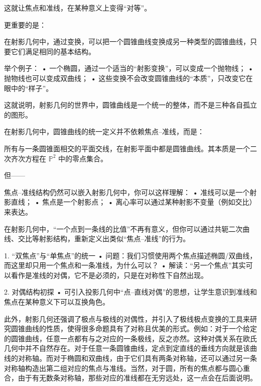 这就让焦点和准线，在某种意义上变得“对等”。

更重要的是：

在射影几何中，通过变换，可以把一个圆锥曲线变换成另一种类型的圆锥曲线，只要它们满足相同的基本结构。

举个例子：
	•	一个椭圆，通过一个适当的“射影变换”，可以变成一个抛物线；
	•	抛物线也可以变成双曲线；
	•	这些变换不会改变圆锥曲线的“本质”，只改变它在眼中的“样子”。

这就说明，射影几何的世界中，圆锥曲线是一个统一的整体，而不是三种各自孤立的图形。


在射影几何中，圆锥曲线的统一定义并不依赖焦点–准线，而是：

所有与一条圆锥面相交的平面交线，在射影平面中都是圆锥曲线。其本质是一个二次齐次方程在 $\mathbb{P}^2$ 中的零点集合。

但——

焦点–准线结构仍然可以嵌入射影几何中，你可以这样理解：
	•	准线可以是一个射影直线；
	•	焦点是一个射影点；
	•	离心率可以通过某种射影不变量（例如交比）来表达。

在射影几何中，“一个点到一条线的比值”不再有意义，但你可以通过共轭二次曲线、交比等射影结构，重新定义出类似“焦点–准线”的行为。

1. “双焦点”与“单焦点”的统一
	•	问题：我们习惯使用两个焦点描述椭圆/双曲线，而这里却只用一个焦点和一条准线，为什么可以？
	•	解读：“另一个焦点”其实可以看作是准线的对偶，它不是必须的，只是在对称性下自然出现。

2. 对偶结构初探
	•	可引入投影几何中“点–直线对偶”的思想，让学生意识到准线和焦点在某种意义下可以互换角色。

此外，射影几何还强调了极点与极线的对偶性，并引入了极线极点变换的工具来研究圆锥曲线的性质，使得很多命题具有了对称且优美的形式。例如：对于一个给定的圆锥曲线，任意一点都有与之对应的一条极线，反之亦然。这种对偶关系在欧氏几何中并不自然存在。对于任意一条圆锥曲线，定点到定直线的垂线方向就是该曲线的对称轴。而对于椭圆和双曲线，由于它们具有两条对称轴，还可以通过另一条对称轴构造出第二组对应的焦点与准线。当然，对于圆，所有的焦点都与圆心重合，由于有无数条对称轴，那些对应的准线都在无穷远处，这一点会在后面说明。
